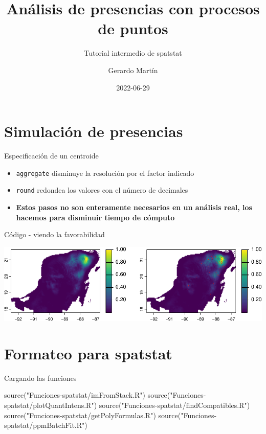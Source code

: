 \documentclass[
  11pt,
  ignorenonframetext,
]{beamer}
\title{Análisis de presencias con procesos de puntos}
\subtitle{Tutorial intermedio de spatstat}
\author{Gerardo Martín}
\date{2022-06-29}
\newenvironment{Shaded}{}{}
\newcommand{\FunctionTok}[1]{\textcolor[rgb]{0.02,0.16,0.49}{#1}}
\newcommand{\NormalTok}[1]{#1}
\newcommand{\StringTok}[1]{\textcolor[rgb]{0.25,0.44,0.63}{#1}}
\begin{document}
\frame{\titlepage}

\hypertarget{simulaciuxf3n-de-presencias}{%
\section{Simulación de presencias}\label{simulaciuxf3n-de-presencias}}

\begin{frame}[fragile]{Especificación de un centroide}
\protect\hypertarget{especificaciuxf3n-de-un-centroide}{}
\begin{itemize}
\item
  \texttt{aggregate} disminuye la resolución por el factor indicado
\item
  \texttt{round} redondea los valores con el número de decimales
\item
  \textbf{Estos pasos no son enteramente necesarios en un análisis real,
  los hacemos para disminuir tiempo de cómputo}
\end{itemize}
\end{frame}

\begin{frame}{Código - viendo la favorabilidad}
\protect\hypertarget{cuxf3digo---viendo-la-favorabilidad}{}
\begin{center}\includegraphics{Tutorial-spatstat-2_files/figure-beamer/unnamed-chunk-2-1} \end{center}
\end{frame}

\hypertarget{formateo-para-spatstat}{%
\section{Formateo para spatstat}\label{formateo-para-spatstat}}

\begin{frame}[fragile]{Cargando las funciones}
\protect\hypertarget{cargando-las-funciones}{}
\begin{Shaded}
\begin{Highlighting}[]
\FunctionTok{source}\NormalTok{(}\StringTok{"Funciones{-}spatstat/imFromStack.R"}\NormalTok{)}
\FunctionTok{source}\NormalTok{(}\StringTok{"Funciones{-}spatstat/plotQuantIntens.R"}\NormalTok{)}
\FunctionTok{source}\NormalTok{(}\StringTok{"Funciones{-}spatstat/findCompatibles.R"}\NormalTok{)}
\FunctionTok{source}\NormalTok{(}\StringTok{"Funciones{-}spatstat/getPolyFormulas.R"}\NormalTok{)}
\FunctionTok{source}\NormalTok{(}\StringTok{"Funciones{-}spatstat/ppmBatchFit.R"}\NormalTok{)}
\end{Highlighting}
\end{Shaded}
\end{frame}
\end{document}
